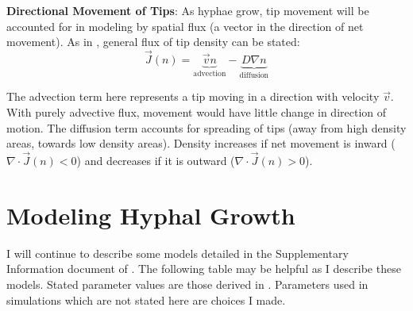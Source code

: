 \documentclass{article}
\begin{document}
\textbf{Directional Movement of Tips}: As hyphae grow, tip movement will be accounted for in modeling by spatial flux (a vector in the direction of net movement). As in \cite{Oyarte2025travelling}, general flux of tip density can be stated: \[\vec{J}(n) = \underbrace{\vec{v}n}_{\text{advection}} -\underbrace{D\nabla n}_{\text{diffusion}}\]

The advection term here represents a tip moving in a direction with velocity $\vec{v}$. With purely advective flux, movement would have little change in direction of motion. The diffusion term accounts for spreading of tips (away from high density areas, towards low density areas). Density increases if net movement is inward ($\nabla\cdot\vec{J}(n)<0$) and decreases if it is outward ($\nabla\cdot\vec{J}(n)>0$).

\section{Modeling Hyphal Growth}
I will continue to describe some models detailed in the Supplementary Information document of \cite{Oyarte2025travelling}. The following table may be helpful as I describe these models. Stated parameter values are those derived in \cite{Oyarte2025travelling}. Parameters used in simulations which are not stated here are choices I made. 
\end{document}
